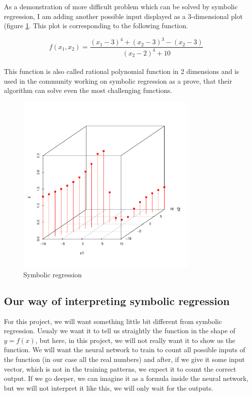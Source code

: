 \documentclass[a4paper,oneside,onecolumn,11pt]{report}
\begin{document}
	As a demonstration of more difficult problem which can be solved by symbolic regression, I am adding another
	possible input displayed as a 3-dimensional plot (figure \ref{3d_input}. This plot is corresponding to the following function.

	\begin{equation}
		f(x_1, x_2) = \frac{(x_1 - 3)^4 + (x_2 - 3)^3 - (x_2 - 3)}{(x_2 - 2)^4 + 10}
	\end{equation}\\

	This function is also called rational polynomial function in 2 dimensions and is used in the community working
	on symbolic regression as a prove, that their algorithm can solve even the most challenging functions.

	\begin{figure}
		\centering
		\includegraphics[width=90mm]{fig/3dfunc.pdf}
		\caption{Symbolic regression}
		\label{3d_input}
	\end{figure}

		\subsection{Our way of interpreting symbolic regression}
			For this project, we will want something little bit different from symbolic regression.
			Usualy we want it to tell us straightly the function in the shape of $y = f(x)$, 
			but here, in this project, we will not really want it to show us the function. We will want 
			the neural network to train to count all possible inputs of the function (in our case all
			the real numbers) and after, if we give it some input vector, which is not in the training
			patterns, we expect it to count the correct output. If we go deeper, we can imagine it
			as a formula inside the neural network, but we will not interpret it like this, we will 
			only wait for the outputs. 
\end{document}

